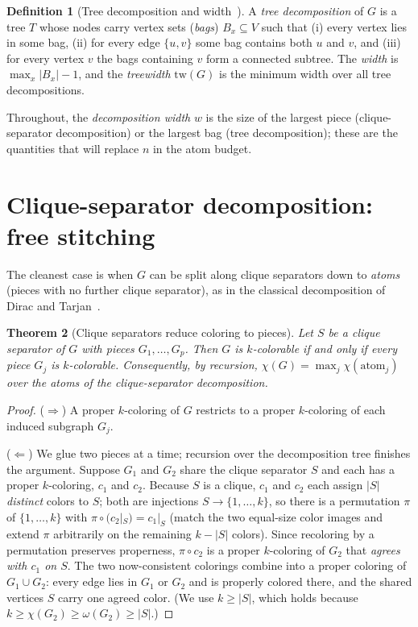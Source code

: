 \documentclass[11pt]{article}
\newtheorem{theorem}{Theorem}[section]
\theoremstyle{definition}
\newtheorem{definition}[theorem]{Definition}
\theoremstyle{remark}
\newcommand{\tw}{\mathrm{tw}}
\begin{document}
\begin{definition}[Tree decomposition and width~\cite{RobertsonSeymour1986}]
A \emph{tree decomposition} of $G$ is a tree $T$ whose nodes carry vertex sets
(\emph{bags}) $B_x\subseteq V$ such that (i) every vertex lies in some bag, (ii)
for every edge $\{u,v\}$ some bag contains both $u$ and $v$, and (iii) for every
vertex $v$ the bags containing $v$ form a connected subtree. The \emph{width} is
$\max_x |B_x|-1$, and the \emph{treewidth} $\tw(G)$ is the minimum width over all
tree decompositions.
\end{definition}

Throughout, the \emph{decomposition width} $w$ is the size of the largest piece
(clique-separator decomposition) or the largest bag (tree decomposition); these are
the quantities that will replace $n$ in the atom budget.

\section{Clique-separator decomposition: free stitching}
\label{sec:clique}

The cleanest case is when $G$ can be split along clique separators down to
\emph{atoms} (pieces with no further clique separator), as in the classical
decomposition of Dirac and Tarjan~\cite{Dirac1961,Tarjan1985}.

\begin{theorem}[Clique separators reduce coloring to pieces]
\label{thm:cliquesep}
Let $S$ be a clique separator of $G$ with pieces $G_1,\dots,G_p$. Then $G$ is
$k$-colorable if and only if every piece $G_j$ is $k$-colorable. Consequently, by
recursion, $\chi(G)=\max_j \chi(\mathrm{atom}_j)$ over the atoms of the
clique-separator decomposition.
\end{theorem}

\begin{proof}
($\Rightarrow$) A proper $k$-coloring of $G$ restricts to a proper $k$-coloring of
each induced subgraph $G_j$.

($\Leftarrow$) We glue two pieces at a time; recursion over the decomposition tree
finishes the argument. Suppose $G_1$ and $G_2$ share the clique separator $S$ and
each has a proper $k$-coloring, $c_1$ and $c_2$. Because $S$ is a clique, $c_1$ and
$c_2$ each assign $|S|$ \emph{distinct} colors to $S$; both are injections
$S\to\{1,\dots,k\}$, so there is a permutation $\pi$ of $\{1,\dots,k\}$ with
$\pi\circ(c_2|_S)=c_1|_S$ (match the two equal-size color images and extend $\pi$
arbitrarily on the remaining $k-|S|$ colors). Since recoloring by a permutation
preserves properness, $\pi\circ c_2$ is a proper $k$-coloring of $G_2$ that
\emph{agrees with $c_1$ on $S$}. The two now-consistent colorings combine into a
proper coloring of $G_1\cup G_2$: every edge lies in $G_1$ or $G_2$ and is properly
colored there, and the shared vertices $S$ carry one agreed color. (We use $k\ge
|S|$, which holds because $k\ge\chi(G_2)\ge\omega(G_2)\ge|S|$.)
\end{proof}
\end{document}
